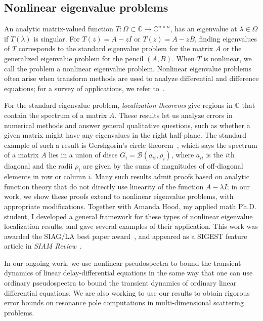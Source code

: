 \documentclass[11pt]{amsart}
\newcommand{\bbC}{\mathbb{C}}
\begin{document}
\subsection*{Nonlinear eigenvalue problems}
An analytic matrix-valued function
$T : \Omega \subset \bbC \rightarrow \bbC^{n \times n}$,
has an eigenvalue at $\lambda \in \Omega$ if $T(\lambda)$ is
singular.  For $T(z) = A-zI$ or $T(z) = A-zB$, finding eigenvalues
of $T$ corresponds to the standard eigenvalue problem for
the matrix $A$ or the generalized eigenvalue problem for the
pencil $(A,B)$.  When $T$ is nonlinear, we call the problem
a nonlinear eigenvalue problem.
Nonlinear eigenvalue problems often arise
when transform methods are used to analyze differential and
difference equations; for a survey of applications,
we refer to~\cite{2015-sirev,Mehrmann:2005:NEP}.

For the standard eigenvalue problem, {\em localization theorems} give
regions in $\bbC$ that contain the spectrum of a matrix $A$.  These
results let us analyze errors in numerical methods and answer general
qualitative questions, such as whether a given matrix might have any
eigenvalues in the right half-plane.  The standard example of such a
result is Gershgorin's circle
theorem~\cite{Varga:2004:GAC,Stewart:1990:MPT}, which says the spectrum
of a matrix $A$ lies in a union of discs $G_i = \mathcal{B}(a_{ii},
\rho_i)$, where $a_{ii}$ is the $i$th diagonal and the radii $\rho_i$
are given by the sums of magnitudes of off-diagonal elements in row or
column $i$.  Many such results admit proofs based on analytic function
theory that do not directly use linearity of the
function $A-\lambda I$; in our work, we show these proofs
extend to nonlinear eigenvalue problems, with appropriate modifications.
Together with Amanda Hood, my applied math Ph.D. student, I developed a
general framework for these types of nonlinear eigenvalue localization
results, and gave several examples of their application.  This work was
awarded the SIAG/LA best paper award~\cite{2013-simax}, and appeared as
a SIGEST feature article in {\em SIAM Review}~\cite{2015-sirev}.

In our ongoing work, we use nonlinear pseudospectra to bound the
transient dynamics of linear delay-differential equations in the same
way that one can use ordinary pseudospectra to bound the transient
dynamics of ordinary linear differential equations.  We are also working
to use our results to obtain rigorous error bounds on resonance pole
computations in multi-dimensional scattering problems.
\end{document}

